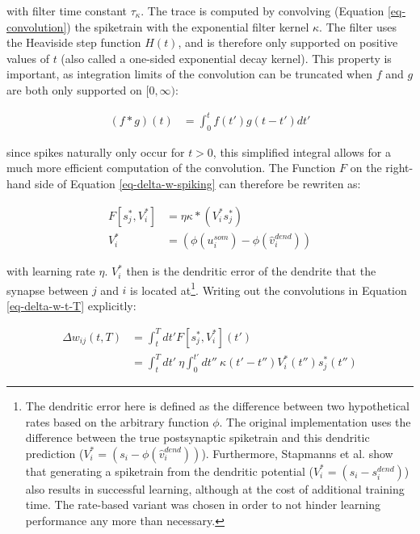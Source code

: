 with filter time constant $\tau_\kappa$. The trace is computed by convolving (Equation \ref{eq-convolution}) the
spiketrain with the exponential filter kernel $\kappa$. The filter uses the Heaviside step function $H(t)$, and is
therefore only supported on positive values of $t$ (also called a one-sided exponential decay kernel). This property is
important, as integration limits of the convolution can be truncated when $f$ and $g$ are both only supported on
$[0,\infty)$:

\begin{align}
  (f \ast g)(t) & = \int_{0}^{t} f(t') g(t-t') d t'
\end{align}

since spikes naturally only occur for $t>0$, this simplified integral allows for a much more efficient computation of
the convolution. The Function $F$ on the right-hand side of Equation \ref{eq-delta-w-spiking} can therefore be rewriten
as:

\begin{align}
  F[s_j^\ast, V_i^\ast] & = \eta \kappa \ast (V_i^\ast s_j^\ast)        \\
  V_i^\ast              & = (\phi(u_i^{som}) - \phi(\hat{v}_i^{dend}) )
\end{align}

with learning rate $\eta$. $V_i^\ast$ then is the dendritic error of the dendrite that the synapse between $j$ and $i$
is located at\footnote{The dendritic error here is defined as the difference between two hypothetical rates based on the
arbitrary function $\phi$. The original implementation uses the difference between the true postsynaptic spiketrain and
this dendritic prediction ($V_i^\ast = (s_i - \phi(\hat{v}_i^{dend}) )$). Furthermore, Stapmanns et al. show that
generating a spiketrain from the dendritic potential ($V_i^\ast = (s_i - s_i^{dend})$) also results in successful
learning, although at the cost of additional training time. The rate-based variant was chosen in order to not hinder
learning performance any more than necessary.}. Writing out the convolutions in Equation \ref{eq-delta-w-t-T}
explicitly:

\begin{align}
  \Delta w_{ij}(t,T) & = \int_t^T dt' F[s_j^\ast, V_i^\ast](t')                                                                           \\
                     & =  \int_t^T dt' \  \eta\int_0^{t'} dt'' \ \kappa(t'-t'') V_i^\ast (t'') s_j^\ast (t'') \label{eq-delta-w-t-T-long}
\end{align}

